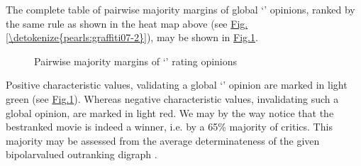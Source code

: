 \documentclass[a4paper,12pt,english]{sphinxhowto}
\let\sphinxpxdimen\pdfpxdimen\else\newdimen\sphinxpxdimen
\begin{document}
\sphinxAtStartPar
The complete table of pairwise majority margins of global ‘’ opinions, ranked by the same rule as shown in the
heat map above (see \hyperref[\detokenize{pearls:graffiti07-2}]{Fig.\@ \ref{\detokenize{pearls:graffiti07-2}}}), may be shown in \hyperref[\detokenize{pearls:graffiti07-3}]{Fig.\@ \ref{\detokenize{pearls:graffiti07-3}}}.

\begin{sphinxVerbatim}[commandchars=\\\{\},numbers=left,firstnumber=1,stepnumber=1]
  
 
   
\end{sphinxVerbatim}

\begin{figure}[H]
\centering
\capstart

\noindent\sphinxincludegraphics[width=650\sphinxpxdimen]{{graffiti07_3}.png}
\caption{Pairwise majority margins of ‘’ rating opinions}\label{\detokenize{pearls:graffiti07-3}}\end{figure}

\sphinxAtStartPar
Positive characteristic values, validating a global ‘’ opinion are marked in light green (see \hyperref[\detokenize{pearls:graffiti07-3}]{Fig.\@ \ref{\detokenize{pearls:graffiti07-3}}}). Whereas negative characteristic values, invalidating such a global opinion, are marked in light red. We may by the way notice that the best\sphinxhyphen{}ranked movie  is indeed a  winner, i.e.  by a 65\% majority of critics. This majority may be assessed from the average determinateness of the given bipolar\sphinxhyphen{}valued outranking digraph .

\begin{sphinxVerbatim}[commandchars=\\\{\}]
    
\end{sphinxVerbatim}
\end{document}
